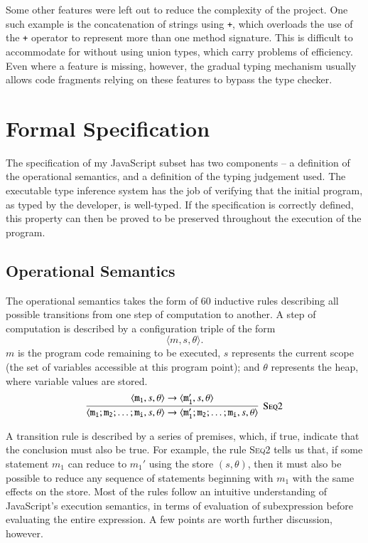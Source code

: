 \documentclass[12pt,a4paper,twoside,openright]{report}
\newcommand*{\js}{\texttt}
\begin{document}
Some other features were left out to reduce the complexity of the project. One
such example is the concatenation of strings using \js{+}, which overloads the
use of the \js{+} operator to represent more than one method signature. This is
difficult to accommodate for without using union types, which carry problems of
efficiency. Even where a feature is missing, however, the gradual typing
mechanism usually allows code fragments relying on these features to bypass the
type checker.

\section{Formal Specification}

The specification of my JavaScript subset has two components -- a definition of
the operational semantics, and a definition of the typing judgement used. The
executable type inference system has the job of verifying that the initial
program, as typed by the developer, is well-typed. If the specification is
correctly defined, this property can then be proved to be preserved throughout the
execution of the program.

\subsection{Operational Semantics}
The operational semantics takes the form of {\color{red}60} inductive rules
describing all possible transitions from one step of computation to another. A
step of computation is described by a configuration triple of the form
$$\langle m, s, \theta\rangle.$$ $m$ is the program code remaining to be
executed, $s$ represents the current scope (the set of variables accessible at
this program point); and $\theta$ represents the heap, where variable values
are stored.
$$\infer[\textsc{Seq2}]
{\langle \mathtt{m_1; m_2; \dots; m_i}, s, \theta\rangle \rightarrow \langle \mathtt{m_1'; m_2; \dots; m_i}, s, \theta\rangle}
{\langle\mathtt{m_1}, s, \theta\rangle\rightarrow\langle \mathtt{m_1'},s, \theta\rangle}$$

A transition rule is described by a series of premises, which, if true,
indicate that the conclusion must also be true. For example, the rule
\textsc{Seq2} tells us that, if some statement $m_1$ can reduce to $m_1'$ using
the store $(s,\theta)$, then it must also be possible to reduce any sequence of
statements beginning with $m_1$ with the same effects on the store. Most of the
rules follow an intuitive understanding of JavaScript's execution semantics, in
terms of evaluation of subexpression before evaluating the entire expression. A
few points are worth further discussion, however.
\end{document}
